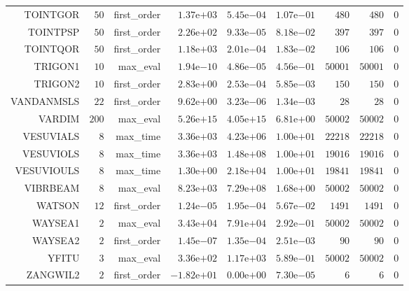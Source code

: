 \begin{longtable}{rrrrrrrrr}
TOINTGOR & \(    50\) & first\_order & \( 1.37\)e\(+03\) & \( 5.45\)e\(-04\) & \( 1.07\)e\(-01\) & \(   480\) & \(   480\) & \(     0\) \\
TOINTPSP & \(    50\) & first\_order & \( 2.26\)e\(+02\) & \( 9.33\)e\(-05\) & \( 8.18\)e\(-02\) & \(   397\) & \(   397\) & \(     0\) \\
TOINTQOR & \(    50\) & first\_order & \( 1.18\)e\(+03\) & \( 2.01\)e\(-04\) & \( 1.83\)e\(-02\) & \(   106\) & \(   106\) & \(     0\) \\
TRIGON1 & \(    10\) & max\_eval & \( 1.94\)e\(-10\) & \( 4.86\)e\(-05\) & \( 4.56\)e\(-01\) & \( 50001\) & \( 50001\) & \(     0\) \\
TRIGON2 & \(    10\) & first\_order & \( 2.83\)e\(+00\) & \( 2.53\)e\(-04\) & \( 5.85\)e\(-03\) & \(   150\) & \(   150\) & \(     0\) \\
VANDANMSLS & \(    22\) & first\_order & \( 9.62\)e\(+00\) & \( 3.23\)e\(-06\) & \( 1.34\)e\(-03\) & \(    28\) & \(    28\) & \(     0\) \\
VARDIM & \(   200\) & max\_eval & \( 5.26\)e\(+15\) & \( 4.05\)e\(+15\) & \( 6.81\)e\(+00\) & \( 50002\) & \( 50002\) & \(     0\) \\
VESUVIALS & \(     8\) & max\_time & \( 3.36\)e\(+03\) & \( 4.23\)e\(+06\) & \( 1.00\)e\(+01\) & \( 22218\) & \( 22218\) & \(     0\) \\
VESUVIOLS & \(     8\) & max\_time & \( 3.36\)e\(+03\) & \( 1.48\)e\(+08\) & \( 1.00\)e\(+01\) & \( 19016\) & \( 19016\) & \(     0\) \\
VESUVIOULS & \(     8\) & max\_time & \( 1.30\)e\(+00\) & \( 2.18\)e\(+04\) & \( 1.00\)e\(+01\) & \( 19841\) & \( 19841\) & \(     0\) \\
VIBRBEAM & \(     8\) & max\_eval & \( 8.23\)e\(+03\) & \( 7.29\)e\(+08\) & \( 1.68\)e\(+00\) & \( 50002\) & \( 50002\) & \(     0\) \\
WATSON & \(    12\) & first\_order & \( 1.24\)e\(-05\) & \( 1.95\)e\(-04\) & \( 5.67\)e\(-02\) & \(  1491\) & \(  1491\) & \(     0\) \\
WAYSEA1 & \(     2\) & max\_eval & \( 3.43\)e\(+04\) & \( 7.91\)e\(+04\) & \( 2.92\)e\(-01\) & \( 50002\) & \( 50002\) & \(     0\) \\
WAYSEA2 & \(     2\) & first\_order & \( 1.45\)e\(-07\) & \( 1.35\)e\(-04\) & \( 2.51\)e\(-03\) & \(    90\) & \(    90\) & \(     0\) \\
YFITU & \(     3\) & max\_eval & \( 3.36\)e\(+02\) & \( 1.17\)e\(+03\) & \( 5.89\)e\(-01\) & \( 50002\) & \( 50002\) & \(     0\) \\
ZANGWIL2 & \(     2\) & first\_order & \(-1.82\)e\(+01\) & \( 0.00\)e\(+00\) & \( 7.30\)e\(-05\) & \(     6\) & \(     6\) & \(     0\) \\\hline
\end{longtable}
